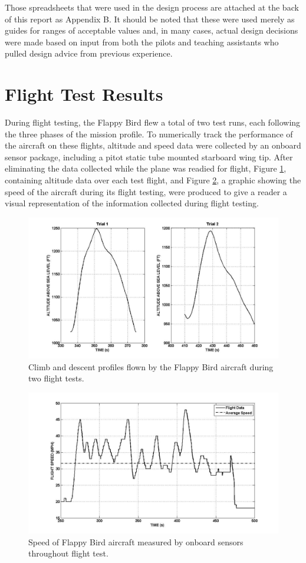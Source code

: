 \documentclass[titlepage]{article}
\begin{document}
Those spreadsheets that were used in the design process are attached at the back of this report as Appendix B. It should be noted that these were used merely as guides for ranges of acceptable values and, in many cases, actual design decisions were made based on input from both the pilots and teaching assistants who pulled design advice from previous experience.

\section{Flight Test Results}
During flight testing, the Flappy Bird flew a total of two test runs, each following the three phases of the mission profile. To numerically track the performance of the aircraft on these flights, altitude and speed data were collected by an onboard sensor package, including a pitot static tube mounted starboard wing tip. After eliminating the data collected while the plane was readied for flight, Figure \ref{Trial}, containing altitude data over each test flight, and Figure \ref{speed}, a graphic showing the speed of the aircraft during its flight testing, were produced to give a reader a visual representation of the information collected during flight testing.

\begin{figure}[h]
 \includegraphics[width=1\columnwidth]{FlightTrialPlots.jpg}
 \caption{Climb and descent profiles flown by the Flappy Bird aircraft during two flight tests.}
\label{Trial}
\end{figure}

\begin{figure}[h]
 \includegraphics[width=1\columnwidth]{speed.jpg}
 \caption{Speed of Flappy Bird aircraft measured by onboard sensors throughout flight test.}
\label{speed}
\end{figure}
\end{document}
